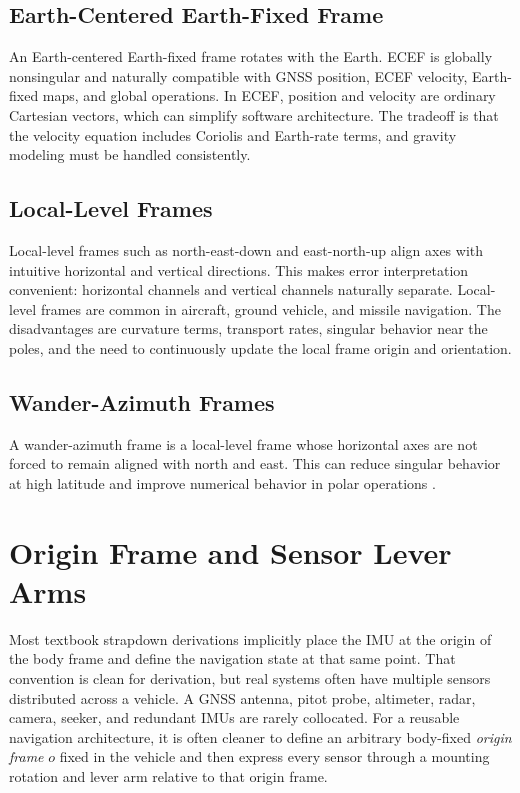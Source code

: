 \documentclass[11pt,oneside]{book}
\begin{document}
\subsection{Earth-Centered Earth-Fixed Frame}
An Earth-centered Earth-fixed frame rotates with the Earth. ECEF is globally nonsingular and naturally compatible with GNSS position, ECEF velocity, Earth-fixed maps, and global operations. In ECEF, position and velocity are ordinary Cartesian vectors, which can simplify software architecture. The tradeoff is that the velocity equation includes Coriolis and Earth-rate terms, and gravity modeling must be handled consistently.

\subsection{Local-Level Frames}
Local-level frames such as north-east-down and east-north-up align axes with intuitive horizontal and vertical directions. This makes error interpretation convenient: horizontal channels and vertical channels naturally separate. Local-level frames are common in aircraft, ground vehicle, and missile navigation. The disadvantages are curvature terms, transport rates, singular behavior near the poles, and the need to continuously update the local frame origin and orientation.

\subsection{Wander-Azimuth Frames}
A wander-azimuth frame is a local-level frame whose horizontal axes are not forced to remain aligned with north and east. This can reduce singular behavior at high latitude and improve numerical behavior in polar operations \cite{titterton2004,groves2013}.


\section{Origin Frame and Sensor Lever Arms}
Most textbook strapdown derivations implicitly place the IMU at the origin of the body frame and define the navigation state at that same point. That convention is clean for derivation, but real systems often have multiple sensors distributed across a vehicle. A GNSS antenna, pitot probe, altimeter, radar, camera, seeker, and redundant IMUs are rarely collocated. For a reusable navigation architecture, it is often cleaner to define an arbitrary body-fixed \emph{origin frame} $o$ fixed in the vehicle and then express every sensor through a mounting rotation and lever arm relative to that origin frame.
\end{document}
